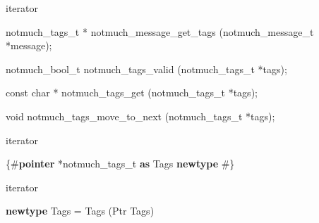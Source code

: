 \documentclass[ignorenonframetext,aspectratio=169]{beamer}
\newenvironment{Shaded}{}{}
\newcommand{\KeywordTok}[1]{\textcolor[rgb]{0.00,0.44,0.13}{\textbf{{#1}}}}
\newcommand{\DataTypeTok}[1]{\textcolor[rgb]{0.56,0.13,0.00}{{#1}}}
\newcommand{\StringTok}[1]{\textcolor[rgb]{0.25,0.44,0.63}{{#1}}}
\newcommand{\FunctionTok}[1]{\textcolor[rgb]{0.02,0.16,0.49}{{#1}}}
\newcommand{\NormalTok}[1]{{#1}}
\begin{document}
\begin{frame}[fragile]{iterator}

\begin{Shaded}
\begin{Highlighting}[]
\NormalTok{notmuch_tags_t *}
\NormalTok{notmuch_message_get_tags (notmuch_message_t *message);}

\NormalTok{notmuch_bool_t}
\NormalTok{notmuch_tags_valid (notmuch_tags_t *tags);}

\DataTypeTok{const} \DataTypeTok{char} \NormalTok{*}
\NormalTok{notmuch_tags_get (notmuch_tags_t *tags);}

\DataTypeTok{void}
\NormalTok{notmuch_tags_move_to_next (notmuch_tags_t *tags);}
\end{Highlighting}
\end{Shaded}

\end{frame}

\begin{frame}[fragile]{iterator}

\begin{Shaded}
\begin{Highlighting}[]
\StringTok{\{#}\KeywordTok{pointer}\StringTok{ *notmuch_tags_t }\KeywordTok{as}\StringTok{ }\DataTypeTok{Tags}\StringTok{ }\KeywordTok{newtype}\StringTok{ #\}}
\end{Highlighting}
\end{Shaded}

\end{frame}

\begin{frame}[fragile]{iterator}

\begin{Shaded}
\begin{Highlighting}[]
\KeywordTok{newtype} \DataTypeTok{Tags} \FunctionTok{=} \DataTypeTok{Tags} \NormalTok{(}\DataTypeTok{Ptr} \DataTypeTok{Tags}\NormalTok{)}
\end{Highlighting}
\end{Shaded}

\end{frame}
\end{document}
